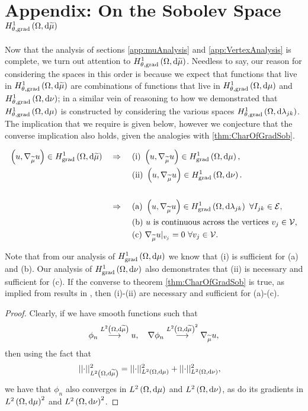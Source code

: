 \section{Appendix: On the Sobolev Space $H^1_{\theta, \mathrm{grad}}\left( \Omega, \mathrm{d}\widetilde{\mu} \right)$} \label{app:SumMeasureAnalysis}
Now that the analysis of sections \ref{app:muAnalysis} and \ref{app:VertexAnalysis} is complete, we turn out attention to $H^1_{\theta, \mathrm{grad}}\left( \Omega, \mathrm{d}\widetilde{\mu} \right)$.
Needless to say, our reason for considering the spaces in this order is because we expect that functions that live in $H^1_{\theta, \mathrm{grad}}\left( \Omega, \mathrm{d}\widetilde{\mu} \right)$ are combinations of functions that live in $H^1_{\theta, \mathrm{grad}}\left( \Omega, \mathrm{d}\mu \right)$ and $H^1_{\theta, \mathrm{grad}}\left( \Omega, \mathrm{d}\nu \right)$; in a similar vein of reasoning to how we demonstrated that $H^1_{\theta, \mathrm{grad}}\left( \Omega, \mathrm{d}\mu \right)$ is constructed by considering the various spaces $H^1_{\theta, \mathrm{grad}}\left( \Omega, \mathrm{d}\lambda_{jk} \right)$.
The implication that we require is given below, however we conjecture that the converse implication also holds, given the analogies with \ref{thm:CharOfGradSob}.
\begin{theorem} \label{thm:ThickVertexSpaceCharacterisation}
	\begin{align*}
		\left( u, \nabla_{\widetilde{\mu}}u \right)\in H^1_\mathrm{grad}\left( \Omega, \mathrm{d}\widetilde{\mu} \right) \quad\Rightarrow\quad
		& \ \text{(i)} \ \left( u, \nabla_{\widetilde{\mu}}u \right)\in H^1_\mathrm{grad}\left( \Omega, \mathrm{d}\mu \right), \\
		& \ \text{(ii)} \ \left( u, \nabla_{\widetilde{\mu}}u \right)\in H^1_\mathrm{grad}\left( \Omega, \mathrm{d}\nu \right). \\
		\\
		\quad\Rightarrow\quad
		& \ \text{(a)} \ \left( u, \nabla_{\widetilde{\mu}}u \right)\in H^1_\mathrm{grad}\left( \Omega, \mathrm{d}\lambda_{jk} \right) \ \forall I_{jk}\in\mathcal{E}, \\
		& \ \text{(b)} \ u \text{ is continuous across the vertices} \ v_j\in\mathcal{V}, \\
		& \ \text{(c)} \ \nabla_{\widetilde{\mu}}u\vert_{v_j} = 0 \ \forall v_j\in\mathcal{V}.
	\end{align*}
\end{theorem}
Note that from our analysis of $H^1_\mathrm{grad}\left( \Omega, \mathrm{d}\mu \right)$ we know that (i) is sufficient for (a) and (b).
Our analysis of $H^1_\mathrm{grad}\left( \Omega, \mathrm{d}\nu \right)$ also demonstrates that (ii) is necessary and sufficient for (c).
If the converse to theorem \ref{thm:CharOfGradSob} is true, as implied from results in \cite{zhikov2002homogenization}, then (i)-(ii) are necessary and sufficient for (a)-(c).
\begin{proof}
	Clearly, if we have smooth functions such that
	\begin{align*}
		\phi_n \overset{L^{2}\left( \Omega,\mathrm{d}\widetilde{\mu} \right)}{\longrightarrow} u, \quad \nabla\phi_n\overset{L^{2}\left( \Omega,\mathrm{d}\widetilde{\mu} \right)^2}{\longrightarrow}\nabla_{\widetilde{\mu}}u,
	\end{align*}
	then using the fact that
	\begin{align*}
		\lvert\lvert \cdot \rvert\rvert_{L^{2}\left( \Omega,\mathrm{d}\widetilde{\mu} \right)}^2 &= \lvert\lvert \cdot \rvert\rvert_{L^{2}\left( \Omega,\mathrm{d}\mu \right)}^2 + \lvert\lvert \cdot \rvert\rvert_{L^{2}\left( \Omega,\mathrm{d}\nu \right)}^2,
	\end{align*}
	we have that $\phi_n$ also converges in $L^{2}\left( \Omega,\mathrm{d}\mu \right)$ and $L^{2}\left( \Omega,\mathrm{d}\nu \right)$, as do its gradients in $L^{2}\left( \Omega,\mathrm{d}\mu \right)^2$ and $L^{2}\left( \Omega,\mathrm{d}\nu \right)^2$.
\end{proof}
